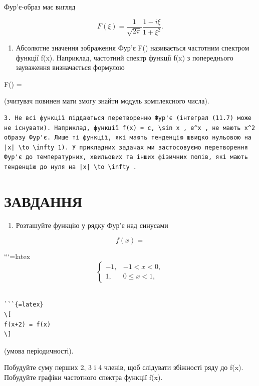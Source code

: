 \documentclass[
  ukrainian,
]{article}
\providecommand{\tightlist}{%
  \setlength{\itemsep}{0pt}\setlength{\parskip}{0pt}}
\begin{document}
Фур'є-образ має вигляд

\[
F(\xi) = \frac{1}{\sqrt{2\pi}} \frac{1 - i\xi}{1 + \xi^2}.
\]

\begin{enumerate}
\def\labelenumi{\arabic{enumi}.}
\setcounter{enumi}{1}
\tightlist
\item
  Абсолютне значення зображення Фур'є \textbar F(\xi)\textbar{}
  називається частотним спектром функції f(x). Наприклад, частотний
  спектр функції f(x) з попереднього зауваження визначається формулою
\end{enumerate}

\textbar F(\xi)\textbar{} = 

(зчитувач повинен мати змогу знайти модуль комплексного числа).

\begin{verbatim}
3. Не всі функції піддаються перетворенню Фур'є (інтеграл (11.7) може не існувати). Наприклад, функції f(x) = c, \sin x , e^x , не мають x^2 образу Фур'є. Лише ті функції, які мають тенденцію швидко нульовою на |x| \to \infty 1). У прикладних задачах ми застосовуємо перетворення Фур'є до температурних, хвильових та інших фізичних полів, які мають тенденцію до нуля на |x| \to \infty .
\end{verbatim}

\section{ЗАВДАННЯ}\label{ux437ux430ux432ux434ux430ux43dux43dux44f-3}

\begin{enumerate}
\def\labelenumi{\arabic{enumi}.}
\tightlist
\item
  Розташуйте функцію у рядку Фур'є над синусами
\end{enumerate}

\[
f(x) =
\]

```{=latex}
\[
\begin{cases} -1, & -1 < x < 0, \\ 1, & 0 \le x < 1, \end{cases}
\]

\begin{verbatim}

```{=latex}
\[
f(x+2) = f(x)
\]
\end{verbatim}

(умова періодичності).

Побудуйте суму перших 2, 3 і 4 членів, щоб слідувати збіжності ряду до
f(x). Побудуйте графіки частотного спектра функції f(x).
\end{document}
